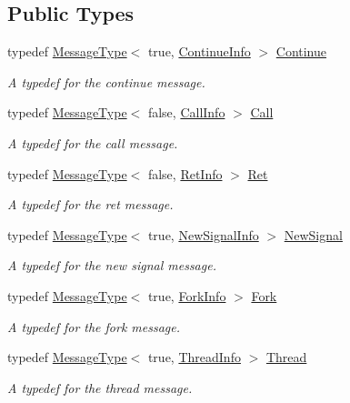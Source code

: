 \subsection*{Public Types}
\begin{DoxyCompactItemize}
\item 
typedef \hyperlink{struct_message_1_1_message_type}{Message\+Type}$<$ true, \hyperlink{struct_message_1_1_continue_info}{Continue\+Info} $>$ \hyperlink{class_message_a04de61b84a209cdf372b6f53f3adf7c4}{Continue}
\begin{DoxyCompactList}\small\item\em A typedef for the continue message. \end{DoxyCompactList}\item 
typedef \hyperlink{struct_message_1_1_message_type}{Message\+Type}$<$ false, \hyperlink{struct_message_1_1_call_info}{Call\+Info} $>$ \hyperlink{class_message_a0fd0ed431cb0d672045d09368a5d2126}{Call}
\begin{DoxyCompactList}\small\item\em A typedef for the call message. \end{DoxyCompactList}\item 
typedef \hyperlink{struct_message_1_1_message_type}{Message\+Type}$<$ false, \hyperlink{struct_message_1_1_ret_info}{Ret\+Info} $>$ \hyperlink{class_message_a146628035f5a0723cb04f7a328858e34}{Ret}
\begin{DoxyCompactList}\small\item\em A typedef for the ret message. \end{DoxyCompactList}\item 
typedef \hyperlink{struct_message_1_1_message_type}{Message\+Type}$<$ true, \hyperlink{struct_message_1_1_new_signal_info}{New\+Signal\+Info} $>$ \hyperlink{class_message_a1b5e44c60a29dd5a935dc354cfa94284}{New\+Signal}
\begin{DoxyCompactList}\small\item\em A typedef for the new signal message. \end{DoxyCompactList}\item 
typedef \hyperlink{struct_message_1_1_message_type}{Message\+Type}$<$ true, \hyperlink{struct_message_1_1_fork_info}{Fork\+Info} $>$ \hyperlink{class_message_ad1eca09e5cd0c92f940f51b847dd7f14}{Fork}
\begin{DoxyCompactList}\small\item\em A typedef for the fork message. \end{DoxyCompactList}\item 
typedef \hyperlink{struct_message_1_1_message_type}{Message\+Type}$<$ true, \hyperlink{struct_message_1_1_thread_info}{Thread\+Info} $>$ \hyperlink{class_message_ad3f3fae0323770c88017fc75b50682d1}{Thread}
\begin{DoxyCompactList}\small\item\em A typedef for the thread message. \end{DoxyCompactList}\end{DoxyCompactItemize}
